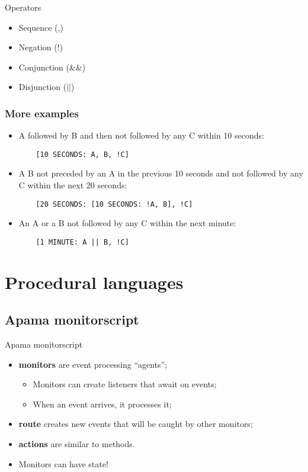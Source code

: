 \documentclass[brown, compress, mathserif]{beamer}
\begin{document}
\begin{frame}{Operators}
  \begin{itemize}
  \item Sequence (,)
  \item Negation (!)
  \item Conjunction (\&\&)
  \item Disjunction ($||$)
  \end{itemize}
\end{frame}


\begin{frame}[fragile]
  \frametitle{More examples}
  \begin{itemize}
  \item A followed by B and then not followed by any C within 10 seconds:
\begin{verbatim}
    [10 SECONDS: A, B, !C]
\end{verbatim}
  \item A B not preceded by an A in the previous 10 seconds and not followed by any C within the next 20 seconds:
\begin{verbatim}
    [20 SECONDS: [10 SECONDS: !A, B], !C]
\end{verbatim}
  \item An A or a B not followed by any C within the next minute:
\begin{verbatim}
    [1 MINUTE: A || B, !C]
\end{verbatim}
  \end{itemize}

\end{frame}


\section{Procedural languages}

\subsection{Apama monitorscript}


\begin{frame}{Apama monitorscript}
  \begin{itemize}
  \item \textbf{monitors} are event processing ``agents'';
    \begin{itemize}
    \item Monitors can create listeners that await on events;
    \item When an event arrives, it processes it;
    \end{itemize}
  \item \textbf{route} creates new events that will be caught by other monitors;
  \item \textbf{actions} are similar to methods.
  \item Monitors can have state!
  \end{itemize}
\end{frame}
\end{document}
